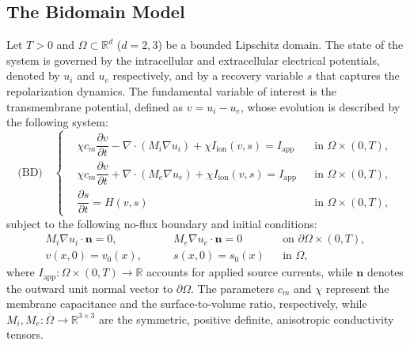 \documentclass[a4paper,11pt]{article}
\theoremstyle{definition}
\numberwithin{equation}{section}
\newcommand{\R}{\mathbb{R}}
\begin{document}
\subsection{The Bidomain Model}
Let $T>0$ and $\Omega \subset \mathbb{R}^d$ ($d=2,3$) be a bounded Lipschitz domain. The state of the system is governed by the intracellular and extracellular electrical potentials, denoted by $u_i$ and $u_e$ respectively, and by a recovery variable $s$ that captures the repolarization dynamics. The fundamental variable of interest is the transmembrane potential, defined as $v = u_i - u_e$, whose evolution is described by the following system:
\begin{equation*}
	\text{(BD)}\quad   \left\{
	\begin{aligned}
		&\chi c_m \dfrac{\partial v}{\partial t} - \nabla \cdot (M_i \nabla u_i) + \chi I_{\text{ion}}(v,s) = I_{\text{app}} && \text{in } \Omega \times (0,T), \\
		&\chi c_m \dfrac{\partial v}{\partial t} + \nabla \cdot (M_e \nabla u_e) + \chi I_{\text{ion}}(v,s) = I_{\text{app}} && \text{in } \Omega \times (0,T), \\
		&\dfrac{\partial s}{\partial t} = H(v,s) && \text{in } \Omega \times (0,T),
	\end{aligned}
	\right.
\end{equation*}
subject to the following no-flux boundary and initial conditions:
\begin{equation*}
	\begin{aligned}
		M_i \nabla u_i \cdot \mathbf{n} = 0, \qquad & M_e \nabla u_e \cdot \mathbf{n} = 0 && \text{on } \partial \Omega \times (0,T), \\
		v(x, 0) = v_{0}(x), \qquad & s(x, 0) = s_{0}(x) && \text{in } \Omega,
	\end{aligned}
\end{equation*}
where $I_{\text{app}} : \Omega \times (0,T) \to \mathbb{R}$ accounts for applied source currents, while $\mathbf{n}$ denotes the outward unit normal vector to $\partial \Omega$. The parameters $c_m$ and $\chi$ represent the membrane capacitance and the surface-to-volume ratio, respectively, while $M_i, M_e: \overline \Omega \to \R^{3 \times 3}$ are the symmetric, positive definite, anisotropic conductivity tensors. 
\end{document}
